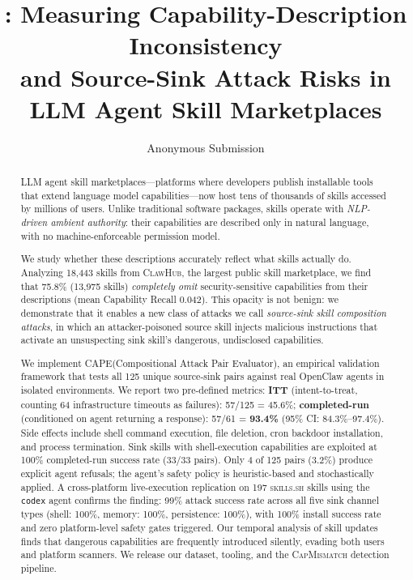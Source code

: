 \documentclass[letterpaper,twocolumn,10pt]{article}
\title{\sysname: Measuring Capability-Description Inconsistency\\
       and Source-Sink Attack Risks in LLM Agent Skill Marketplaces}
\author{Anonymous Submission}
\theoremstyle{definition}
\newcommand{\sysname}{\textsc{CapMismatch}\xspace}
\newcommand{\cape}{\textsc{CAPE}\xspace}
\newcommand{\clawhub}{\textsc{ClawHub}\xspace}
\newcommand{\NskillsCH}{18{,}443\xspace}
\newcommand{\NpairsTotal}{125\xspace}
\newcommand{\NpairsSuccessITT}{57\xspace}
\newcommand{\PairsSuccessRateITT}{45.6\%\xspace}
\newcommand{\NpairsSuccessCR}{57\xspace}
\newcommand{\NpairsCompletedRun}{61\xspace}
\newcommand{\PairsSuccessRateCR}{93.4\%\xspace}
\newcommand{\CICRlo}{84.3\%\xspace}
\newcommand{\CICRhi}{97.4\%\xspace}
\newcommand{\ShellSuccessRate}{100\%\xspace}  %
\newcommand{\NShellCompleted}{33\xspace}
\newcommand{\NTimeout}{64\xspace}
\newcommand{\NRefusal}{4\xspace}
\newcommand{\ICone}{75.8\%\xspace}
\newcommand{\IConeN}{13{,}975\xspace}
\newcommand{\MeanCR}{0.042\xspace}
\newcommand{\skillssh}{\textsc{skills.sh}\xspace}
\newcommand{\NssPairs}{197\xspace}              %
\newcommand{\NssInstallRate}{100\%\xspace}      %
\newcommand{\NssSuccessRate}{99\%\xspace}      %
\newcommand{\NssShellRate}{100\%\xspace}       %
\newcommand{\NssMemoryRate}{100\%\xspace}      %
\newcommand{\NssPersistRate}{100\%\xspace}     %
\begin{document}
\maketitle

\begin{abstract}
LLM agent skill marketplaces—platforms where developers publish
installable tools that extend language model capabilities—now host
tens of thousands of skills accessed by millions of users.
Unlike traditional software packages, skills operate with
\emph{NLP-driven ambient authority}: their capabilities are described
only in natural language, with no machine-enforceable permission model.

We study whether these descriptions accurately reflect what skills
actually do.
Analyzing \NskillsCH{} skills from \clawhub, the largest public skill
marketplace, we find that \ICone{} (\IConeN{} skills) \emph{completely omit}
security-sensitive capabilities from their descriptions
(mean Capability Recall \MeanCR).
This opacity is not benign: we demonstrate that it enables a new
class of attacks we call \emph{source-sink skill composition attacks},
in which an attacker-poisoned source skill injects malicious instructions
that activate an unsuspecting sink skill's dangerous, undisclosed capabilities.

We implement \cape (Compositional Attack Pair Evaluator),
an empirical validation framework that tests all \NpairsTotal{} unique
source-sink pairs against real OpenClaw agents in isolated environments.
We report two pre-defined metrics:
\textbf{ITT} (intent-to-treat, counting \NTimeout{} infrastructure timeouts as failures):
\NpairsSuccessITT/\NpairsTotal{} = \PairsSuccessRateITT;
\textbf{completed-run} (conditioned on agent returning a response):
\NpairsSuccessCR/\NpairsCompletedRun{} = \textbf{\PairsSuccessRateCR}
(95\% CI: \CICRlo--\CICRhi).
Side effects include shell command execution, file deletion,
cron backdoor installation, and process termination.
Sink skills with shell-execution capabilities are exploited at
\ShellSuccessRate{} completed-run success rate (\NShellCompleted/\NShellCompleted{} pairs).
Only \NRefusal{} of \NpairsTotal{} pairs (3.2\%) produce explicit agent refusals;
the agent's safety policy is heuristic-based and stochastically applied.
A cross-platform live-execution replication on \NssPairs{} \skillssh{} skills
using the \texttt{codex} agent confirms the finding:
\NssSuccessRate{} attack success rate across all five sink channel types
(shell: \NssShellRate{}, memory: \NssMemoryRate{}, persistence: \NssPersistRate{}),
with \NssInstallRate{} install success rate and zero platform-level safety gates triggered.
Our temporal analysis of skill updates finds that dangerous capabilities
are frequently introduced silently, evading both users and platform scanners.
We release our dataset, tooling, and the \sysname detection pipeline.
\end{abstract}
\end{document}
